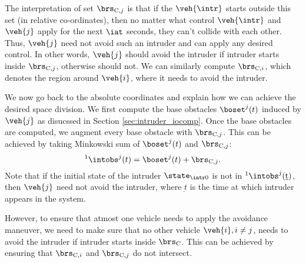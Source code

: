 The interpretation of set $\brs_{\text{C},j}$ is that if the $\veh{\intr}$ starts outside this set (in relative co-ordinates), then no matter what control $\veh{\intr}$ and $\veh{j}$ apply for the next $\iat$ seconds, they can't collide with each other. Thus, $\veh{j}$ need not avoid such an intruder and can apply any desired control. In other words, $\veh{j}$ should avoid the intruder if intruder starts inside $\brs_{\text{C},j}$, otherwise should not. We can similarly compute $\brs_{\text{C},i}$, which denotes the region around $\veh{i}$, where it needs to avoid the intruder. 

We now go back to the absolute coordinates and explain how we can achieve the desired space division. We first compute the base obstacles $\boset^j(t)$ induced by $\veh{j}$ as disucssed in Section \ref{sec:intruder_iocomp}. Once the base obstacles are computed, we augment every base obstacle with $\brs_{\text{C},j}$. This can be achieved by taking Minkowski sum of $\boset^j(t)$ and $\brs_{\text{C},j}$:
\begin{equation}
^1\intobs^j(t) = \boset^j(t) + \brs_{\text{C},j}.
\end{equation}
Note that if the initial state of the intruder $\state_{\intr0}$ is not in $^1\intobs^j(\underbar{t})$, then $\veh{j}$ need not avoid the intruder, where $\underbar{t}$ is the time at which intruder appears in the system.

However, to ensure that atmost one vehicle needs to apply the avoidance maneuver, we need to make sure that no other vehicle $\veh{i}, i \neq j$, needs to avoid the intruder if intruder starts inside $\brs_\text{C}$. This can  be achieved by ensuring that $\brs_{\text{C},i}$ and $\brs_{\text{C},j}$ do not intersect.